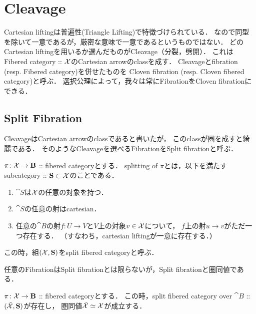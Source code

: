 \section{Cleavage}
    Cartesian liftingは普遍性(Triangle Lifting)で特徴づけられている．
    なので同型を除いて一意であるが，厳密な意味で一意であるというものではない．
    どのCartesian liftingを用いるか選んだものがCleavage（分裂，劈開）．
    これはFibered category :: $\mathcal{X}$のCartesian arrowのclassを成す．
    Cleavageとfibration (resp. Fibered category)を併せたものを
    Cloven fibration (resp. Cloven fibered category)と呼ぶ．
    選択公理によって，我々は常にFibrationをCloven fibrationにできる．

\subsection{ Split Fibration }
    CleavageはCartesian arrowのclassであると書いたが，
    このclassが圏を成すと綺麗である．
    そのようなCleavageを選べるFibrationをSplit fibrationと呼ぶ．

    \begin{Def}
        $\pi \colon \mathcal{X} \to \mathbf{B}$ :: fibered categoryとする．
        splitting of $\pi$とは，以下を満たすsubcategory :: $\mathbf{S} \subset \mathcal{X}$のことである．
        \begin{enumerate}
            \item
                $\cat{S}$は$\mathcal{X}$の任意の対象を持つ．
            \item
                $\cat{S}$の任意の射はcartesian．
            \item
                任意の$\cat{B}$の射$f \colon U \to V$と$V$上の対象$v \in \mathcal{X}$について，
                $f$上の射$u \to v$がただ一つ存在する．
                （すなわち，cartesian liftingが一意に存在する．）
        \end{enumerate}
        この時，組$(\mathcal{X}, \mathbf{S})$をsplit fibered categoryと呼ぶ．
    \end{Def}

    任意のFibrationはSplit fibrationとは限らないが，Split fibrationと圏同値である．

    \begin{Thm}
        $\pi \colon \mathcal{X} \to \mathbf{B}$ :: fibered categoryとする．
        この時，split fibered category over $\cat{B}$ :: $(\tilde{\mathcal{X}}, \mathbf{S})$が存在し，
        圏同値$\tilde{\mathcal{X}} \overset{{}}{\simeq} \mathcal{X}$が成立する．
    \end{Thm}


